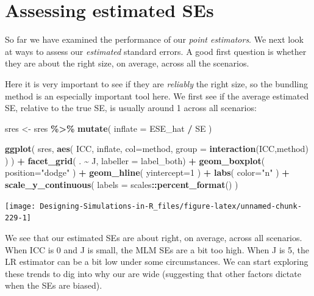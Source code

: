 \documentclass[
]{book}
\newenvironment{Shaded}{\begin{snugshade}}{\end{snugshade}}
\newcommand{\AttributeTok}[1]{\textcolor[rgb]{0.13,0.29,0.53}{#1}}
\newcommand{\DecValTok}[1]{\textcolor[rgb]{0.00,0.00,0.81}{#1}}
\newcommand{\FunctionTok}[1]{\textcolor[rgb]{0.13,0.29,0.53}{\textbf{#1}}}
\newcommand{\NormalTok}[1]{#1}
\newcommand{\OtherTok}[1]{\textcolor[rgb]{0.56,0.35,0.01}{#1}}
\newcommand{\SpecialCharTok}[1]{\textcolor[rgb]{0.81,0.36,0.00}{\textbf{#1}}}
\newcommand{\StringTok}[1]{\textcolor[rgb]{0.31,0.60,0.02}{#1}}
\begin{document}
\section{Assessing estimated SEs}\label{assessing-estimated-ses}

So far we have examined the performance of our \emph{point estimators}.
We next look at ways to assess our \emph{estimated} standard errors.
A good first question is whether they are about the right size, on average, across all the scenarios.

Here it is very important to see if they are \emph{reliably} the right size, so the bundling method is an especially important tool here.
We first see if the average estimated SE, relative to the true SE, is usually around 1 across all scenarios:

\begin{Shaded}
\begin{Highlighting}[]
\NormalTok{sres }\OtherTok{\textless{}{-}}\NormalTok{ sres }\SpecialCharTok{\%\textgreater{}\%}
  \FunctionTok{mutate}\NormalTok{( }\AttributeTok{inflate =}\NormalTok{ ESE\_hat }\SpecialCharTok{/}\NormalTok{ SE  ) }

\FunctionTok{ggplot}\NormalTok{( sres,}
        \FunctionTok{aes}\NormalTok{( ICC, inflate, }\AttributeTok{col=}\NormalTok{method,}
             \AttributeTok{group =} \FunctionTok{interaction}\NormalTok{(ICC,method) ) ) }\SpecialCharTok{+}
    \FunctionTok{facet\_grid}\NormalTok{( . }\SpecialCharTok{\textasciitilde{}}\NormalTok{ J, }\AttributeTok{labeller =}\NormalTok{ label\_both) }\SpecialCharTok{+}
  \FunctionTok{geom\_boxplot}\NormalTok{( }\AttributeTok{position=}\StringTok{"dodge"}\NormalTok{ ) }\SpecialCharTok{+}
  \FunctionTok{geom\_hline}\NormalTok{( }\AttributeTok{yintercept=}\DecValTok{1}\NormalTok{ ) }\SpecialCharTok{+}
  \FunctionTok{labs}\NormalTok{( }\AttributeTok{color=}\StringTok{"n"}\NormalTok{ ) }\SpecialCharTok{+}
  \FunctionTok{scale\_y\_continuous}\NormalTok{( }\AttributeTok{labels =}\NormalTok{ scales}\SpecialCharTok{::}\FunctionTok{percent\_format}\NormalTok{() ) }
\end{Highlighting}
\end{Shaded}

\begin{center}\texttt{[image: Designing-Simulations-in-R\_files/figure-latex/unnamed-chunk-229-1]} \end{center}

We see that our estimated SEs are about right, on average, across all scenarios.
When ICC is 0 and J is small, the MLM SEs are a bit too high.
When J is 5, the LR estimator can be a bit low under some circumstances.
We can start exploring these trends to dig into why our are wide (suggesting that other factors dictate when the SEs are biased).
\end{document}
